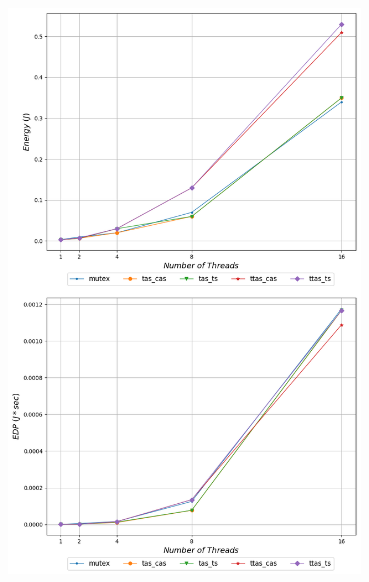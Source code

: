 \begin{minipage}{\textwidth}
   \begin{center}
      \\
      \vspace{3mm}
      \includegraphics[width=0.7\textwidth]{./graphs/sniper/energy/grain-10.png}
      \vspace{6mm}
   \end{center}
\end{minipage}

